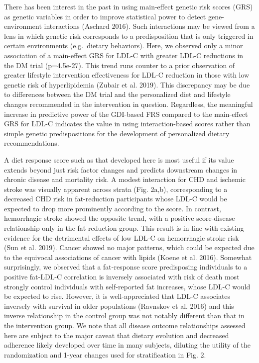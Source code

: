\documentclass[]{article}
\begin{document}
There has been interest in the past in using main-effect genetic risk
scores (GRS) as genetic variables in order to improve statistical power
to detect gene-environment interactions (Aschard 2016). Such
interactions may be viewed from a lens in which genetic risk corresponds
to a predisposition that is only triggered in certain environments
(e.g.~dietary behaviors). Here, we observed only a minor association of
a main-effect GRS for LDL-C with greater LDL-C reductions in the DM
trial (p=4.5e-27). This trend runs counter to a prior observation of
greater lifestyle intervention effectiveness for LDL-C reduction in
those with low genetic risk of hyperlipidemia (Zubair et al. 2019). This
discrepancy may be due to differences between the DM trial and the
personalized diet and lifestyle changes recommended in the intervention
in question. Regardless, the meaningful increase in predictive power of
the GDI-based FRS compared to the main-effect GRS for LDL-C indicates
the value in using interaction-based scores rather than simple genetic
predispositions for the development of personalized dietary
recommendations.

A diet response score such as that developed here is most useful if its
value extends beyond just risk factor changes and predicts downstream
changes in chronic disease and mortality risk. A modest interaction for
CHD and ischemic stroke was visually apparent across strata (Fig. 2a,b),
corresponding to a decreased CHD risk in fat-reduction participants
whose LDL-C would be expected to drop more prominently according to the
score. In contrast, hemorrhagic stroke showed the opposite trend, with a
positive score-disease relationship only in the fat reduction group.
This result is in line with existing evidence for the detrimental
effects of low LDL-C on hemorrhagic stroke risk (Sun et al. 2019).
Cancer showed no major patterns, which could be expected due to the
equivocal associations of cancer with lipids (Koene et al. 2016).
Somewhat surprisingly, we observed that a fat-response score
predisposing individuals to a positive fat-LDL-C correlation is
inversely associated with risk of death most strongly control
individuals with self-reported fat increases, whose LDL-C would be
expected to rise. However, it is well-appreciated that LDL-C associates
inversely with survival in older populations (Ravnskov et al. 2016) and
this inverse relationship in the control group was not notably different
than that in the intervention group. We note that all disease outcome
relationships assessed here are subject to the major caveat that dietary
evolution and decreased adherence likely developed over time in many
subjects, diluting the utility of the randomization and 1-year changes
used for stratification in Fig. 2.
\end{document}
